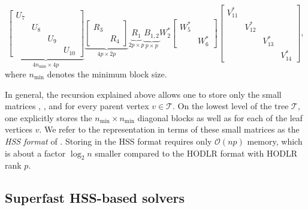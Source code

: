 \documentclass[final,reqno,onefignum,onetabnum]{siamart190516}
\newcommand{\nmin}{n_{\min}}
\begin{document}
\[
 \underbrace{\begin{bmatrix} 
U_{7} & & & \\
& U_{8} & & \\
& & U_{9} & \\
& & & U_{10}
\end{bmatrix}}_{4 \nmin \times 4 p} \underbrace{\begin{bmatrix} R_3 & \\ & R_4\end{bmatrix}}_{4p \times 2p} \underbrace{R_1}_{2p\times p} \underbrace{B_{1,2}}_{p \times p} W_2^* \begin{bmatrix} W_5^* & \\ & W_6^*\end{bmatrix} \begin{bmatrix} 
V_{11}^* & & & \\
& V_{12}^* & & \\
& & V_{13}^* & \\
& & & V_{14}^*
\end{bmatrix},
\]
where $\nmin$ denotes the minimum block size.

In general, the recursion explained above allows one to store only the small matrices , , and  for every parent vertex $v\in \mathcal T$. On the lowest level \smash{$\widehat{\ell}$} of the tree $\mathcal T$,
one explicitly stores the $\nmin \times \nmin$ diagonal blocks as well as   for each of the  leaf vertices $v$. We refer to the representation in terms of these small matrices as the \textit{HSS format} of . Storing  in the HSS format requires only $\mathcal{O}(n p)$ memory, which is about a factor $\log_2 n$ smaller compared to the HODLR format with HODLR rank $p$.

\subsection{Superfast HSS-based solvers}

\label{sec:advantagesHSS} 
\end{document}
